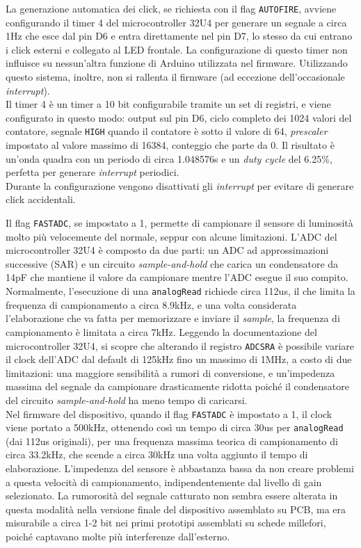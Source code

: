 La generazione automatica dei click, se richiesta con il flag \texttt{AUTOFIRE}, avviene configurando il timer 4 del microcontroller 32U4 per generare un segnale a circa 1Hz che esce dal pin D6 e entra direttamente nel pin D7, lo stesso da cui entrano i click esterni e collegato al LED frontale. La configurazione di questo timer non influisce su nessun'altra funzione di Arduino utilizzata nel firmware. Utilizzando questo sistema, inoltre, non si rallenta il firmware (ad eccezione dell'occasionale \textit{interrupt}).\\
Il timer 4 è un timer a 10 bit configurabile tramite un set di registri\cite{atmega32u4_datasheet}, e viene configurato in questo modo: output sul pin D6, ciclo completo dei 1024 valori del contatore, segnale \texttt{HIGH} quando il contatore è sotto il valore di 64, \textit{prescaler} impostato al valore massimo di 16384, conteggio che parte da 0. Il risultato è un'onda quadra con un periodo di circa 1.048576s e un \textit{duty cycle} del 6.25\%, perfetta per generare \textit{interrupt} periodici.\\
Durante la configurazione vengono disattivati gli \textit{interrupt} per evitare di generare click accidentali.

Il flag \texttt{FASTADC}, se impostato a 1, permette di campionare il sensore di luminosità molto più velocemente del normale, seppur con alcune limitazioni. L'ADC del microcontroller 32U4 è composto da due parti: un ADC ad approssimazioni successive (SAR) e un circuito \textit{sample-and-hold} che carica un condensatore da 14pF che mantiene il valore da campionare mentre l'ADC esegue il suo compito.\\
Normalmente, l'esecuzione di una \texttt{analogRead} richiede circa 112us, il che limita la frequenza di campionamento a circa 8.9kHz, e una volta considerata l'elaborazione che va fatta per memorizzare e inviare il \textit{sample}, la frequenza di campionamento è limitata a circa 7kHz. Leggendo la documentazione del microcontroller 32U4, si scopre che alterando il registro \texttt{ADCSRA} è possibile variare il clock dell'ADC dal default di 125kHz fino un massimo di 1MHz\cite{atmega32u4_datasheet}, a costo di due limitazioni: una maggiore sensibilità a rumori di conversione, e un'impedenza massima del segnale da campionare drasticamente ridotta poiché il condensatore del circuito \textit{sample-and-hold} ha meno tempo di caricarsi.\\
Nel firmware del dispositivo, quando il flag \texttt{FASTADC} è impostato a 1, il clock viene portato a 500kHz, ottenendo così un tempo di circa 30us per \texttt{analogRead} (dai 112us originali), per una frequenza massima teorica di campionamento di circa 33.2kHz, che scende a circa 30kHz una volta aggiunto il tempo di elaborazione. L'impedenza del sensore è abbastanza bassa da non creare problemi a questa velocità di campionamento, indipendentemente dal livello di gain selezionato. La rumorosità del segnale catturato non sembra essere alterata in questa modalità nella versione finale del dispositivo assemblato su PCB, ma era misurabile a circa 1-2 bit nei primi prototipi assemblati su schede millefori, poiché captavano molte più interferenze dall'esterno.

